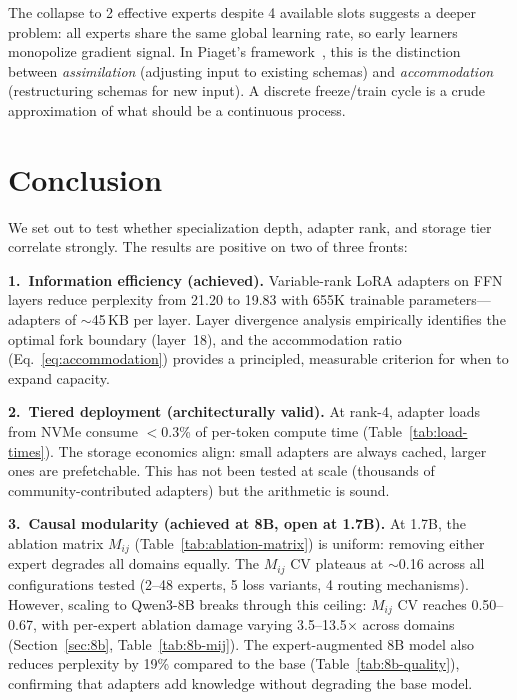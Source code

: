 \documentclass{article}
\begin{document}
The collapse to 2 effective experts despite 4 available slots suggests a
deeper problem: all experts share the same global learning rate, so early
learners monopolize gradient signal. In Piaget's
framework~\cite{piaget1952}, this is the distinction between
\emph{assimilation} (adjusting input to existing schemas) and
\emph{accommodation} (restructuring schemas for new input). A discrete
freeze/train cycle is a crude approximation of what should be a continuous
process.

\section{Conclusion}

We set out to test whether specialization depth, adapter rank, and storage tier
correlate strongly. The results are positive on two of three fronts:

\textbf{1.~Information efficiency (achieved).} Variable-rank LoRA adapters on
FFN layers reduce perplexity from 21.20 to 19.83 with 655K trainable
parameters---adapters of $\sim$45\,KB per layer. Layer divergence analysis
empirically identifies the optimal fork boundary (layer~18), and the
accommodation ratio (Eq.~\ref{eq:accommodation}) provides a principled,
measurable criterion for when to expand capacity.

\textbf{2.~Tiered deployment (architecturally valid).} At rank-4, adapter
loads from NVMe consume $<$0.3\% of per-token compute time
(Table~\ref{tab:load-times}). The storage economics align: small adapters are
always cached, larger ones are prefetchable. This has not been tested at scale
(thousands of community-contributed adapters) but the arithmetic is sound.

\textbf{3.~Causal modularity (achieved at 8B, open at 1.7B).} At 1.7B, the
ablation matrix $M_{ij}$ (Table~\ref{tab:ablation-matrix}) is uniform:
removing either expert degrades all domains equally. The $M_{ij}$ CV plateaus
at $\sim$0.16 across all configurations tested (2--48 experts, 5 loss variants,
4 routing mechanisms). However, scaling to Qwen3-8B breaks through this
ceiling: $M_{ij}$ CV reaches 0.50--0.67, with per-expert ablation damage
varying 3.5--13.5$\times$ across domains
(Section~\ref{sec:8b}, Table~\ref{tab:8b-mij}). The expert-augmented 8B model
also reduces perplexity by 19\% compared to the base
(Table~\ref{tab:8b-quality}), confirming that adapters add knowledge without
degrading the base model.
\end{document}

